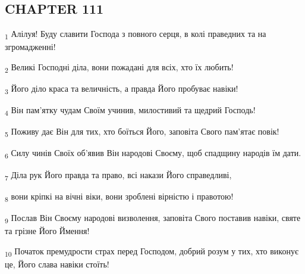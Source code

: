 \subsection{CHAPTER 111}
\begin{tcolorbox}
\textsubscript{1} Алілуя! Буду славити Господа з повного серця, в колі праведних та на згромадженні!
\end{tcolorbox}
\begin{tcolorbox}
\textsubscript{2} Великі Господні діла, вони пожадані для всіх, хто їх любить!
\end{tcolorbox}
\begin{tcolorbox}
\textsubscript{3} Його діло краса та величність, а правда Його пробуває навіки!
\end{tcolorbox}
\begin{tcolorbox}
\textsubscript{4} Він пам'ятку чудам Своїм учинив, милостивий та щедрий Господь!
\end{tcolorbox}
\begin{tcolorbox}
\textsubscript{5} Поживу дає Він для тих, хто боїться Його, заповіта Свого пам'ятає повік!
\end{tcolorbox}
\begin{tcolorbox}
\textsubscript{6} Силу чинів Своїх об'явив Він народові Своєму, щоб спадщину народів їм дати.
\end{tcolorbox}
\begin{tcolorbox}
\textsubscript{7} Діла рук Його правда та право, всі накази Його справедливі,
\end{tcolorbox}
\begin{tcolorbox}
\textsubscript{8} вони кріпкі на вічні віки, вони зроблені вірністю і правотою!
\end{tcolorbox}
\begin{tcolorbox}
\textsubscript{9} Послав Він Своєму народові визволення, заповіта Свого поставив навіки, святе та грізне Його Ймення!
\end{tcolorbox}
\begin{tcolorbox}
\textsubscript{10} Початок премудрости страх перед Господом, добрий розум у тих, хто виконує це, Його слава навіки стоїть!
\end{tcolorbox}
